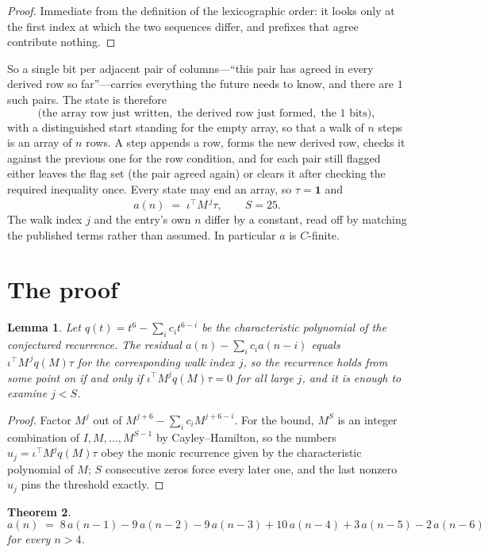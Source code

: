 \documentclass[11pt,a4paper]{article}
\theoremstyle{plain}
\newtheorem{theorem}{Theorem}
\newtheorem{lemma}[theorem]{Lemma}
\theoremstyle{definition}
\begin{document}
\begin{proof}
Immediate from the definition of the lexicographic order: it looks only at the first index at
which the two sequences differ, and prefixes that agree contribute nothing.
\end{proof}

So a single bit per adjacent pair of columns---``this pair has agreed in every derived row so
far''---carries everything the future needs to know, and there are $1$ such pairs. The state
is therefore
\[
\bigl(\text{the array row just written},\; \text{the derived row just formed},\;
\text{the 1 bits}\bigr),
\]
with a distinguished start standing for the empty array, so that a walk of $n$ steps is an array
of $n$ rows. A step appends a row, forms the new derived row, checks it against the previous one
for the row condition, and for each pair still flagged either leaves the flag set (the pair
agreed again) or clears it after checking the required inequality once. Every state may end an
array, so $\tau=\mathbf{1}$ and
\[
a(n)\;=\;\iota^{\!\top}M^{\,j}\tau ,\qquad S=25.
\]
The walk index $j$ and the entry's own $n$ differ by a constant, read off by matching the
published terms rather than assumed. In particular $a$ is $C$-finite.

\section{The proof}

\begin{lemma}\label{lem:crit}
Let $q(t)=t^{6}-\sum_i c_it^{6-i}$ be the characteristic polynomial of the
conjectured recurrence. The residual $a(n)-\sum_ic_ia(n-i)$ equals
$\iota^{\!\top}M^{\,j}q(M)\tau$ for the corresponding walk index $j$, so the recurrence
holds from some point on if and only if $\iota^{\!\top}M^{j}q(M)\tau=0$ for all large $j$,
and it is enough to examine $j<S$.
\end{lemma}

\begin{proof}
Factor $M^{j}$ out of $M^{j+6}-\sum_ic_iM^{j+6-i}$. For the bound, $M^{S}$
is an integer combination of $I,M,\dots,M^{S-1}$ by Cayley--Hamilton, so the numbers
$u_j=\iota^{\!\top}M^{j}q(M)\tau$ obey the monic recurrence given by the characteristic
polynomial of $M$; $S$ consecutive zeros force every later one, and the last nonzero $u_j$
pins the threshold exactly.
\end{proof}

\begin{theorem}
\[
a(n)\;=\;8\,a(n-1) - 9\,a(n-2) - 9\,a(n-3) + 10\,a(n-4) + 3\,a(n-5) - 2\,a(n-6)
\]
for every $n>4$.
\end{theorem}
\end{document}
